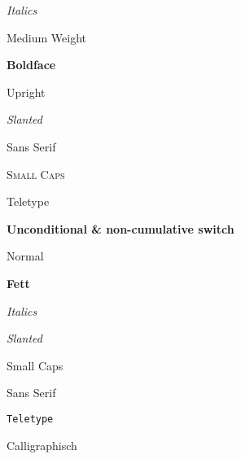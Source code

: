 \documentclass[a5paper]{article}
\begin{document}
\begin{example}
{\itshape Italics}
\end{example}

\begin{example}
{\mdseries Medium Weight}
\end{example}

\begin{example}
{\bfseries Boldface}
\end{example}

\begin{example}
{\upshape Upright}
\end{example}


\begin{example}
{\slshape Slanted}
\end{example}

\begin{example}
{\sffamily Sans Serif}
\end{example}


\begin{example}
{\scshape Small Caps}
\end{example}

\begin{example}
{\ttfamily Teletype}
\end{example}










\bigskip

\textbf{Unconditional \& non-cumulative switch}

\begin{example}
Normal
\end{example}

\begin{example}
{\bf Fett}
\end{example}


\begin{example}
{\it Italics}
\end{example}

\begin{example}
{\sl Slanted}
\end{example}


\begin{example}
{\sc Small Caps}
\end{example}


\begin{example}
{\sf Sans Serif}
\end{example}

\begin{example}
{\tt Teletype}
\end{example}

\begin{example}
{\cal Calligraphisch}
\end{example}
\end{document}
